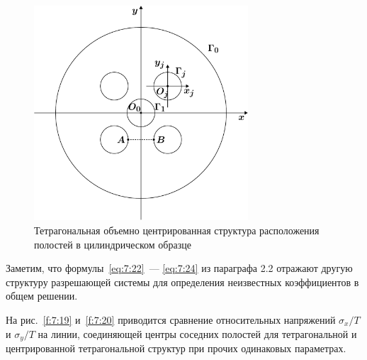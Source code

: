 \begin{figure}[h!]
\centering
\includegraphics[width=8cm]{tetragonal-centroid.pdf}
\caption{Тетрагональная объемно центрированная структура расположения полостей в цилиндрическом образце}
\label{f:7:18}
\end{figure}
 
Заметим, что формулы~\eqref{eq:7:22}~--- \eqref{eq:7:24} из параграфа 2.2 отражают другую структуру разрешающей системы для определения неизвестных коэффициентов в общем решении.

На рис.~\ref{f:7:19} и~\ref{f:7:20} приводится сравнение относительных напряжений $\sigma_x/T$ и $\sigma_y/T$ на линии, соединяющей центры соседних полостей для тетрагональной и центрированной тетрагональной структур при прочих одинаковых параметрах.

